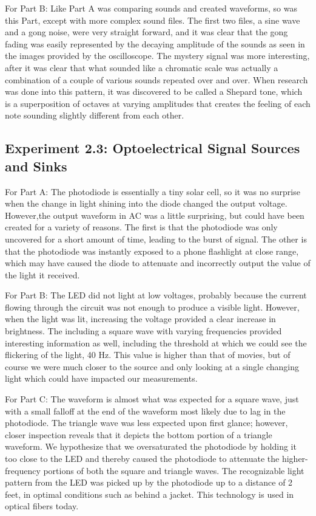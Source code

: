 \documentclass[10pt]{article}
\begin{document}
For Part B: Like Part A was comparing sounds and created waveforms, so was this Part, except with more complex sound files. The first two files, a sine wave and a gong noise, were very straight forward, and it was clear that the gong fading was easily represented by the decaying amplitude of the sounds as seen in the images provided by the oscilloscope. The mystery signal was more interesting, after it was clear that what sounded like a chromatic scale was actually a combination of a couple of various sounds repeated over and over. When research was done into this pattern, it was discovered to be called a Shepard tone, which is a superposition of octaves at varying amplitudes that creates the feeling of each note sounding slightly different from each other.

\subsection{Experiment 2.3: Optoelectrical Signal Sources and Sinks}

For Part A: The photodiode is essentially a tiny solar cell, so it was no surprise when the change in light shining into the diode changed the output voltage. However,the output waveform in AC was a little surprising, but could have been created for a variety of reasons. The first is that the photodiode was only uncovered for a short amount of time, leading to the burst of signal. The other is that the photodiode was instantly exposed to a phone flashlight at close range, which may have caused the diode to attenuate and incorrectly output the value of the light it received.

For Part B: The LED did not light at low voltages, probably because the current flowing through the circuit was not enough to produce a visible light. However, when the light was lit, increasing the voltage provided a clear increase in brightness. The including a square wave with varying frequencies provided interesting information as well, including the threshold at which we could see the flickering of the light, 40 Hz. This value is higher than that of movies, but of course we were much closer to the source and only looking at a single changing light which could have impacted our measurements. 

For Part C: The waveform is almost what was expected for a square wave, just with a small falloff at the end of the waveform most likely due to lag in the photodiode. The triangle wave was less expected upon first glance; however, closer inspection reveals that it depicts the bottom portion of a triangle waveform. We hypothesize that we oversaturated the photodiode by holding it too close to the LED and thereby caused the photodiode to attenuate the higher-frequency portions of both the square and triangle waves. The recognizable light pattern from the LED was picked up by the photodiode up to a distance of 2 feet, in optimal conditions such as behind a jacket. This technology is used in optical fibers today.
\end{document}
